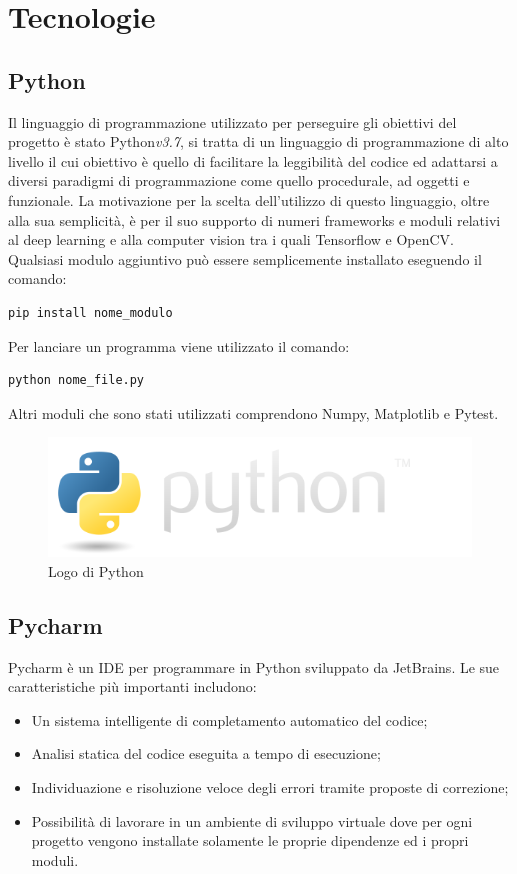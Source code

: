\section{Tecnologie}
\subsection{Python}
Il linguaggio di programmazione utilizzato per perseguire gli obiettivi del progetto è stato Python\textit{v3.7}, si tratta di un linguaggio di programmazione di alto livello il cui obiettivo è quello di facilitare la leggibilità del codice ed adattarsi a diversi paradigmi di programmazione come quello procedurale, ad oggetti e funzionale. La motivazione per la scelta dell'utilizzo di questo linguaggio, oltre alla sua semplicità, è per il suo supporto di numeri frameworks e moduli relativi al deep learning e alla computer vision tra i quali Tensorflow e OpenCV. Qualsiasi modulo aggiuntivo può essere semplicemente installato eseguendo il comando:
\begin{verbatim}
pip install nome_modulo
\end{verbatim}
Per lanciare un programma viene utilizzato il comando:
\begin{verbatim}
python nome_file.py
\end{verbatim}
Altri moduli che sono stati utilizzati comprendono Numpy, Matplotlib e Pytest.
\begin{figure}[H]
	\centering
	\includegraphics[width=0.7\linewidth]{images/logo-python.png}
	\caption{Logo di Python}
	\label{Logo di Python}
\end{figure}
\subsection{Pycharm}
Pycharm è un IDE per programmare in Python sviluppato da JetBrains. Le sue caratteristiche più importanti includono: 
\begin{itemize}
\item Un sistema intelligente di completamento automatico del codice;
\item Analisi statica del codice eseguita a tempo di esecuzione;
\item Individuazione e risoluzione veloce degli errori tramite proposte di correzione;
\item Possibilità di lavorare in un ambiente di sviluppo virtuale dove per ogni progetto vengono installate solamente le proprie dipendenze ed i propri moduli. 
\end{itemize}
